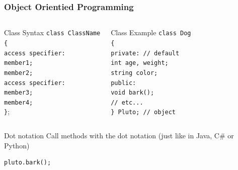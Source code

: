 \documentclass[compress]{beamer}
\newcommand{\tab}{\hspace*{1em}}
\begin{document}
 
\begin{frame}[fragile]
	\frametitle{Object Orientied Programming}
     	\begin{columns}
     		\column[t]{5cm}
     		\begin{exampleblock}{Class Syntax}
     			\texttt{class ClassName}\\
     			\texttt{\{} \\
     			\tab \texttt{access specifier:}\\
     			\tab \tab \texttt{member1;}\\
     			\tab \tab \texttt{member2;}\\
     			\tab \texttt{access specifier:}\\
     			\tab \tab \texttt{member3;}\\
     			\tab \tab \texttt{member4;}\\
     			\texttt{\}}; \\

     		\end{exampleblock}
     		\column[t]{5cm}
     		\begin{exampleblock}{Class Example}
     			\texttt{class Dog}\\
     			\texttt{\{} \\
     			\tab \texttt{private: // default}\\
     			\tab \tab \texttt{int age, weight;}\\
     			\tab \tab \texttt{string color;}\\
     			\tab \texttt{public:}\\
     			\tab \tab \texttt{void bark();}\\
     			\tab \tab \texttt{// etc...}\\
     			\texttt{\} Pluto; // object} \\     
     		\end{exampleblock}
     	\end{columns}
     \begin{exampleblock}{Dot notation}
     	Call methods with the dot notation (just like in Java, C\# or Python)
    \end{exampleblock}	
\begin{lstlisting}
pluto.bark();
\end{lstlisting}
     
\end{frame}  
     
\end{document}
